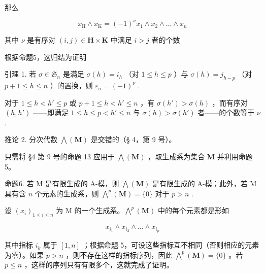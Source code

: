 那么

\[
x _ {\mathrm{H}} \wedge x _ {\mathrm{K}} = (- 1) ^ {\nu} x _ {1} \wedge x _ {2} \wedge \dots \wedge x _ {n}\tag{7}
\]

其中 \(\nu\) 是有序对 \((i,j)\in \mathbf{H}\times \mathbf{K}\) 中满足 \(i > j\) 者的个数

根据命题5，这归结为证明

引理 1. 若 \(\sigma \in \mathfrak{S}_n\) 是满足 \(\sigma(h) = i_h\) （对 \(1 \leqslant h \leqslant p\) ）与 \(\sigma(h) = j_{h-p}\) （对 \(p + 1 \leqslant h \leqslant n\) ）的置换，则 \(\varepsilon_\sigma = (-1)^{\nu}\) .

对于 \(1 \leqslant h < h' \leqslant p\) 或 \(p + 1 \leqslant h < h' \leqslant n\) ，有 \(\sigma(h') > \sigma(h)\) ，而有序对 \((h, h')\) ——即满足 \(1 \leqslant h \leqslant p < h' \leqslant n\) 与 \(\sigma(h) > \sigma(h')\) 者——的个数等于 \(\nu\) .

推论 2. 分次代数 \(\bigwedge (\mathbf{M})\) 是交错的（§ 4，第 9 号）。

只需将 §4 第 9 号的命题 13 应用于 \(\bigwedge (\mathbf{M})\) ，取生成系为集合 \(\mathbf{M}\) 并利用命题5。

命题6. 若 M 是有限生成的 A-模，则 \(\bigwedge (\mathbf{M})\) 是有限生成的 A-模；此外，若 M 具有含 \(n\) 个元素的生成系，则 \(\bigwedge^{p}(\mathbf{M}) = \{0\}\) 对于 \(p > n\) .

设 \((x_{i})_{1\leqslant i\leqslant n}\) 为 M 的一个生成系。\(\bigwedge^{p}(\mathbf{M})\) 中的每个元素都是形如

\[
x _ {i _ {1}} \wedge x _ {i _ {2}} \wedge \dots \wedge x _ {i _ {p}}
\]

其中指标 \(i_k\) 属于 \([1, n]\) ；根据命题 5，可设这些指标互不相同（否则相应的元素为零）。如果 \(p > n\) ，则不存在这样的指标序列，因此 \(\bigwedge^p(\mathbf{M}) = \{0\}\) 。若 \(p \leqslant n\) ，这样的序列只有有限多个，这就完成了证明。

